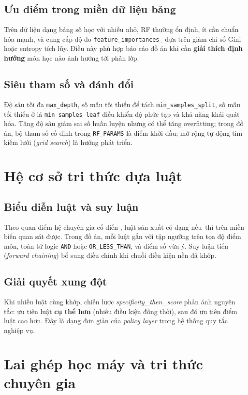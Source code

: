 \subsection{Ưu điểm trong miền dữ liệu bảng}
Trên dữ liệu dạng bảng số học với nhiễu nhỏ, RF thường ổn định, ít cần chuẩn hóa mạnh, và cung cấp độ đo \texttt{feature\_importances\_} dựa trên giảm chỉ số Gini hoặc entropy tích lũy. Điều này phù hợp báo cáo đồ án khi cần \textbf{giải thích định hướng} môn học nào ảnh hưởng tới phân lớp.

\subsection{Siêu tham số và đánh đổi}
Độ sâu tối đa \texttt{max\_depth}, số mẫu tối thiểu để tách \texttt{min\_samples\_split}, số mẫu tối thiểu ở lá \texttt{min\_samples\_leaf} điều khiển độ phức tạp và khả năng khái quát hóa. Tăng độ sâu giảm sai số huấn luyện nhưng có thể tăng overfitting; trong đồ án, bộ tham số cố định trong \texttt{RF\_PARAMS} là điểm khởi đầu; mở rộng tự động tìm kiếm lưới (\textit{grid search}) là hướng phát triển.

\section{Hệ cơ sở tri thức dựa luật}
\subsection{Biểu diễn luật và suy luận}
Theo quan điểm hệ chuyên gia cổ điển \cite{jackson}, luật sản xuất có dạng nếu--thì trên miền biến quan sát được. Trong đồ án, mỗi luật gắn với tập ngưỡng trên tọa độ điểm môn, toán tử logic \texttt{AND} hoặc \texttt{OR\_LESS\_THAN}, và điểm số vừa ý. Suy luận tiến (\textit{forward chaining}) bổ sung điều chỉnh khi chuỗi điều kiện nền đã khớp.

\subsection{Giải quyết xung đột}
Khi nhiều luật cùng khớp, chiến lược \textit{specificity\_then\_score} phản ánh nguyên tắc: ưu tiên luật \textbf{cụ thể hơn} (nhiều điều kiện đồng thời), sau đó ưu tiên điểm luật cao hơn. Đây là dạng đơn giản của \textit{policy layer} trong hệ thống quy tắc nghiệp vụ.

\section{Lai ghép học máy và tri thức chuyên gia}
